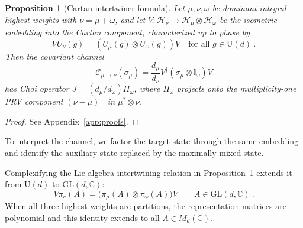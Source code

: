 \documentclass[a4paper,onecolumn,11pt]{quantumarticle}
\newtheorem{prop}{Proposition}
\def\id{\mathbb{I}}
\begin{document}
\begin{prop}[Cartan intertwiner formula]\label{prop:choi}
Let $\mu,\nu,\omega$ be dominant integral highest weights with
$\nu=\mu+\omega$, and let
$V:\mathcal H_\nu\to\mathcal H_\mu\otimes\mathcal H_\omega$ be the isometric embedding into the Cartan component, characterized up to phase by
\begin{equation}
    VU_\nu(g)=(U_\mu(g)\otimes U_\omega(g))V
    \quad\text{for all }g\in\mathrm U(d)\ .
\end{equation}
Then the covariant channel
\begin{equation}
    \mathcal C_{\mu\to\nu}(\sigma_\mu)
    =\frac{d_\mu}{d_\nu}V^\dagger(\sigma_\mu\otimes\id_\omega)V
\end{equation}
has Choi operator $J=(d_\mu/d_\omega)\Pi_\omega$, where $\Pi_\omega$ projects onto the multiplicity-one PRV component $(\nu-\mu)^+$ in $\mu^*\otimes\nu$.
\end{prop}
\begin{proof}See Appendix~\ref{app:proofs}.
\end{proof}

To interpret the channel, we factor the target state through the same
embedding and identify the auxiliary state replaced by the maximally
mixed state.

Complexifying the Lie-algebra intertwining relation in
Proposition~\ref{prop:choi} extends it from $\mathrm U(d)$ to
$\mathrm{GL}(d,\mathbb C)$:
\[
V\pi_\nu(A)=\bigl(\pi_\mu(A)\otimes\pi_\omega(A)\bigr)V
\qquad A\in\mathrm{GL}(d,\mathbb C)\ .
\]
When all three highest weights are partitions, the representation
matrices are polynomial and this identity extends to all
$A\in M_d(\mathbb C)$.
\end{document}
